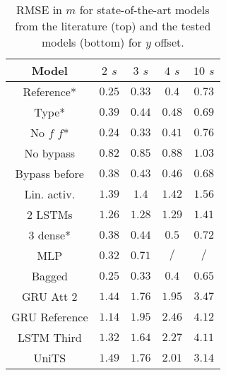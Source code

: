 \documentclass[preprint,12pt]{elsarticle}
\begin{document}
\begin{table}[!ht]
	\centering
    \begin{tabular}{|c|c|c|c|c|}
        \hline
        Model & $2$ $s$ & $3$ $s$ & $4$ $s$ & $10$ $s$ \\ \hline
        Reference* & $0.25$ & $\mathbf{0.33}$ & $\mathbf{0.4}$ & $0.73$ \\
        Type* & $0.39$ & $0.44$ & $0.48$ & $0.69$ \\
        No $f$ $f$* & $\mathbf{0.24}$ & $0.33$ & $0.41$ & $0.76$ \\
        No bypass & $0.82$ & $0.85$ & $0.88$ & $1.03$ \\
        Bypass before & $0.38$ & $0.43$ & $0.46$ & $0.68$ \\
        Lin. activ. & $1.39$ & $1.4$ & $1.42$ & $1.56$ \\
        2 LSTMs & $1.26$ & $1.28$ & $1.29$ & $1.41$ \\
        3 dense* & $0.38$ & $0.44$ & $0.5$ & $0.72$ \\
        MLP & $0.32$ & $0.71$ & $/$ & $/$ \\
        Bagged & $0.25$ & $0.33$ & $0.4$ & $\mathbf{0.65}$ \\ \hline
        GRU Att 2 & $1.44$ & $1.76$ & $1.95$ & $3.47$ \\
        GRU Reference & $1.14$ & $1.95$ & $2.46$ & $4.12$ \\
        LSTM Third & $1.32$ & $1.64$ & $2.27$ & $4.11$ \\
        UniTS & $1.49$ & $1.76$ & $2.01$ & $3.14$ \\ \hline
    \end{tabular}
    \caption{RMSE in $m$ for state-of-the-art models from the literature (top) and the tested models (bottom) for $y$ offset.}
    \label{tab:lateral_position}
\end{table}
\end{document}
